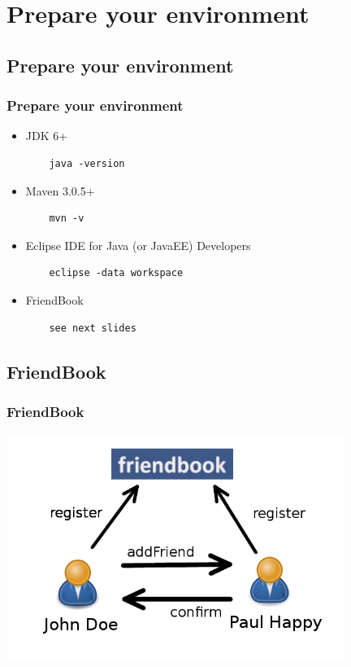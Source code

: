 \documentclass{beamer}
\begin{document}
\section{Prepare your environment}

\subsection{Prepare your environment}
\begin{frame}[fragile]
\frametitle{Prepare your environment}
\begin{itemize}
\item JDK 6+
  \begin{lstlisting}
    java -version
  \end{lstlisting}
\item Maven 3.0.5+
  \begin{lstlisting}
    mvn -v
  \end{lstlisting}
\item Eclipse IDE for Java (or JavaEE) Developers
  \begin{lstlisting}
    eclipse -data workspace
  \end{lstlisting}
\item FriendBook
  \begin{lstlisting}
    see next slides
  \end{lstlisting}
\end{itemize}
\end{frame}

\subsection{FriendBook}
\begin{frame}[fragile]
\frametitle{FriendBook}
\begin{center}
  \includegraphics[width=11cm]{friendbook.png}
\end{center}  
\end{frame}
\end{document}
